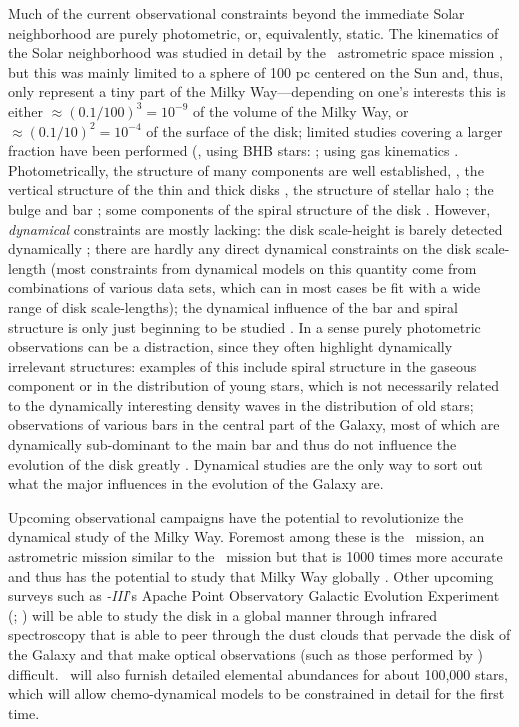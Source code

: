 Much of the current observational constraints beyond the immediate
Solar neighborhood are purely photometric, or, equivalently,
static. The kinematics of the Solar neighborhood was studied in detail
by the \Hipparcos\ astrometric space mission \citep{ESA97a}, but this
was mainly limited to a sphere of 100 pc centered on the Sun and,
thus, only represent a tiny part of the Milky Way---depending on one's
interests this is either $\approx (0.1/100)^3 = 10^{-9}$ of the volume
of the Milky Way, or $\approx (0.1/10)^2 = 10^{-4}$ of the surface of
the disk; limited studies covering a larger fraction have been
performed (\eg, using BHB stars: \citealt{Xue08a}; using gas
kinematics \citealt{Merrifield92a}. Photometrically, the structure of
many components are well established, \eg, the vertical structure of
the thin and thick disks \citep{Juric08a}, the structure of stellar
halo \citep{deJong10a}; the bulge and bar \citep{Blitz91a}; some
components of the spiral structure of the
disk \citep{Benjamin05a}. However, \emph{dynamical} constraints are
mostly lacking: the disk scale-height is barely detected dynamically
\citep{Kuijken89a,Siebert03a}; there are hardly any
direct dynamical constraints on the disk scale-length (most
constraints from dynamical models on this quantity come from
combinations of various data sets, which can in most cases be fit with
a wide range of disk scale-lengths); the dynamical influence of the
bar and spiral structure is only just beginning to be
studied \citep[\eg,][]{dehnen00a,fux01a,deSimone04a,Quillen05a,Antoja09a}. In
a sense purely photometric observations can be a distraction, since
they often highlight dynamically irrelevant structures: examples of
this include spiral structure in the gaseous component or in the
distribution of young stars, which is not necessarily related to the
dynamically interesting density waves in the distribution of old
stars; observations of various bars in the central part of the Galaxy,
most of which are dynamically sub-dominant to the main bar and thus do
not influence the evolution of the disk
greatly \citep[\eg][]{Nishiyama05a,Benjamin05a,Lopez07a,Green11a}. Dynamical
studies are the only way to sort out what the major influences in the
evolution of the Galaxy are.

Upcoming observational campaigns have the potential to revolutionize
the dynamical study of the Milky Way. Foremost among these is
the \Gaia\ mission, an astrometric mission similar to the \Hipparcos\
mission but that is 1000 times more accurate and thus has the
potential to study that Milky Way
globally \citep{2001A&A...369..339P}. Other upcoming surveys such
as \sdss\emph{-III}'s Apache Point Observatory Galactic Evolution
Experiment (\apogee; \citealt{Eisenstein11a}) will be able to study
the disk in a global manner through infrared spectroscopy that is able
to peer through the dust clouds that pervade the disk of the Galaxy
and that make optical observations (such as those performed by \Gaia)
difficult. \apogee\ will also furnish detailed elemental abundances
for about 100,000 stars, which will allow chemo-dynamical models to be
constrained in detail for the first time.

